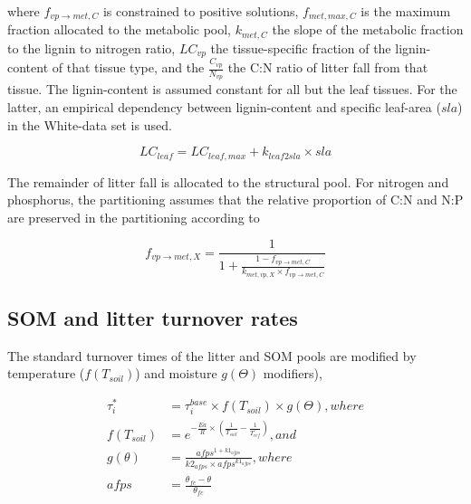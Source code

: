 where $f_{vp \rightarrow met,C}$ is constrained to positive solutions, $f_{met,max,C}$ is the maximum fraction allocated to the metabolic pool, $k_{met,C}$ the slope of the metabolic fraction to the lignin to nitrogen ratio, $LC_{vp}$ the tissue-specific fraction of the lignin-content of that tissue type, and the $\frac{C_{vp}}{N_{vp}}$ the C:N ratio of litter fall from that tissue. The lignin-content is assumed constant for all but the leaf tissues. For the latter, an empirical dependency between lignin-content and specific leaf-area ($sla$) in the White-data set \cite{White:2000vl} is used.

\begin{equation}\label{eq:sb:simple_leaf_lc}
LC_{leaf} = LC_{leaf,max} + k_{leaf2sla} \times sla
\end{equation}

The remainder of litter fall is allocated to the structural pool. For nitrogen and phosphorus, the partitioning assumes that the relative proportion of C:N and N:P are preserved in the partitioning according to 

\begin{equation}\label{eq:sb:simple_litterpartitioning_np}
f_{vp \rightarrow met,X} = \frac{1}{1+\frac{1-f_{vp \rightarrow met,C}}{k_{met,vp,X} \times f_{vp \rightarrow met,C}}}
\end{equation}

\subsection{SOM and litter turnover rates}\label{sec:sb:turnover}

The standard turnover times of the litter and SOM pools are modified by temperature ($f(T_{soil})$) and moisture $g(\Theta)$ modifiers),

\begin{subequations}\label{eq:simple_som_turnover}
\begin{align}
\tau^{*}_i &= \tau^{base}_i \times f(T_{soil}) \times g(\Theta), where\\
f(T_{soil}) &= e^{-\frac{Ea}{R} \times (\frac{1}{T_{soil}} - \frac{1}{T^{\tau}_{ref}})}, and\\
g(\theta) &= \frac{afps^{1+k1_{afps}}}{k2_{afps} \times afps^{k1_{afps}}}, where\\
afps &= \frac{\theta_{fc}-\theta}{\theta_{fc}}
\end{align}
\end{subequations}


